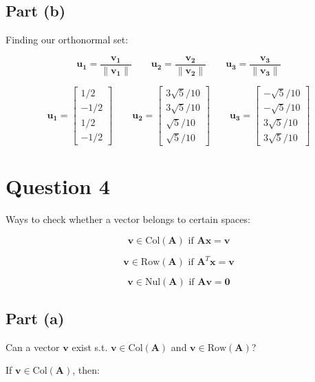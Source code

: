 \documentclass{article}
\begin{document}
\subsection{Part (b)} 
Finding our orthonormal set:


\[%
    \mathbf{u_1}
    =
    \frac{\mathbf{v_1}}{\|\mathbf{v_1}\|}
    \qquad
    \mathbf{u_2}
    =
    \frac{\mathbf{v_2}}{\|\mathbf{v_2}\|}
    \qquad
    \mathbf{u_3}
    =
    \frac{\mathbf{v_3}}{\|\mathbf{v_3}\|}
\]%

\[%
    \mathbf{u_1}
    =
    \begin{bmatrix}1/2\\-1/2\\1/2\\-1/2\end{bmatrix}
    \qquad
    \mathbf{u_2}
    =
    \begin{bmatrix}3\sqrt{5}/10\\3\sqrt{5}/10\\\sqrt{5}/10\\\sqrt{5}/10\end{bmatrix}
    \qquad
    \mathbf{u_3}
    =
    \begin{bmatrix}-\sqrt{5}/10\\-\sqrt{5}/10\\3\sqrt{5}/10\\3\sqrt{5}/10\end{bmatrix}    
\]%

\clearpage
\section{Question 4} 
Ways to check whether a vector belongs to certain spaces:

\[%
    \mathbf{v} \in  \text{Col}(\mathbf{A}) \text{ if } 
    \mathbf{A}\mathbf{x}
    =
    \mathbf{v}
\]%

\[%
    \mathbf{v} \in \text{Row}(\mathbf{A}) \text{ if } 
    \mathbf{A}^{T}\mathbf{x}
    =
    \mathbf{v}
\]%

\[%
    \mathbf{v} \in \text{Nul}(\mathbf{A}) \text{ if } 
    \mathbf{A}\mathbf{v}
    =
    \mathbf{0}
\]%
\subsection{Part (a)} 
Can a vector $\mathbf{v}$ exist s.t. $\mathbf{v} \in \text{Col}(\mathbf{A})$ and
$\mathbf{v} \in \text{Row}(\mathbf{A})$?

If $\mathbf{v} \in \text{Col}(\mathbf{A})$, then:
\end{document}
